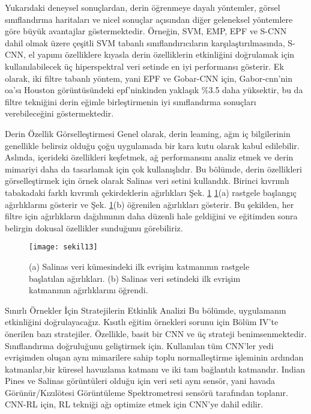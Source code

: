 \documentclass{beamer}
\begin{document}
\begin{frame}
Yukarıdaki deneysel sonuçlardan, derin öğrenmeye dayalı yöntemler, görsel sınıflandırma haritaları ve nicel sonuçlar açısından diğer geleneksel yöntemlere göre büyük avantajlar göstermektedir. Örneğin, SVM, EMP, EPF ve S-CNN dahil olmak üzere çeşitli SVM tabanlı sınıflandırıcıların karşılaştırılmasında, S-CNN, el yapımı özelliklere kıyasla derin özelliklerin etkinliğini doğrulamak için kullanılabilecek üç hiperspektral veri setinde en iyi performansı gösterir. Ek olarak, iki filtre tabanlı yöntem, yani EPF ve Gobar-CNN için, Gabor-cnn'nin oa'sı Houston görüntüsündeki epf'ninkinden yaklaşık \%3.5 daha yüksektir, bu da filtre tekniğini derin eğimle birleştirmenin iyi sınıflandırma sonuçları verebileceğini göstermektedir.
\end{frame}

\begin{frame}{Derin Özellik Görselleştirmesi}
	Genel olarak, derin leaming, ağın iç bilgilerinin genellikle belirsiz olduğu çoğu uygulamada bir kara kutu olarak kabul edilebilir. Aslında, içerideki özellikleri keşfetmek, ağ performansını analiz etmek ve derin mimariyi daha da tasarlamak için çok kullanışlıdır. Bu bölümde, derin özellikleri görselleştirmek için örnek olarak Salinas veri setini kullandık. Birinci kıvrımlı tabakadaki farklı kıvrımlı çekirdeklerin ağırlıkları Şek. \ref{fig:sekil11} \ref{fig:sekil11}(a) rastgele başlangıç ağırlıklarını gösterir ve Şek. \ref{fig:sekil11}(b) öğrenilen ağırlıkları gösterir. Bu şekilden, her filtre için ağırlıkların dağılımının daha düzenli hale geldiğini ve eğitimden sonra belirgin dokusal özellikler sunduğunu görebiliriz.
\end{frame}

\begin{frame}
\begin{figure}[]
	\centering
	\texttt{[image: sekil13]} %
	\caption{(a) Salinas veri kümesindeki ilk evrişim katmanının rastgele başlatılan ağırlıkları. (b) Salinas veri setindeki ilk evrişim katmanının ağırlıklarını öğrendi.}
	\label{fig:sekil11}
\end{figure}
\end{frame}

\begin{frame}{Sınırlı Örnekler İçin Stratejilerin Etkinlik Analizi}
	Bu bölümde, uygulamanın etkinliğini doğrulayacağız. Kısıtlı eğitim örnekleri sorunu için Bölüm IV'te önerilen bazı stratejiler. Özellikle, basit bir CNN ve üç strateji benimsenmektedir. Sınıflandırma doğruluğunu geliştirmek için. Kullanılan tüm CNN’ler yedi evrişimden oluşan aynı mimarilere sahip toplu normalleştirme işleminin ardından katmanlar,bir küresel havuzlama katmanı ve iki tam bağlantılı katmandır. Indian Pines ve Salinas görüntüleri olduğu için veri seti aynı sensör, yani havada Görünür/Kızılötesi Görüntüleme Spektrometresi sensörü tarafından toplanır. CNN-RL için, RL tekniği ağı optimize etmek için CNN'ye dahil edilir.
\end{frame}
\end{document}
